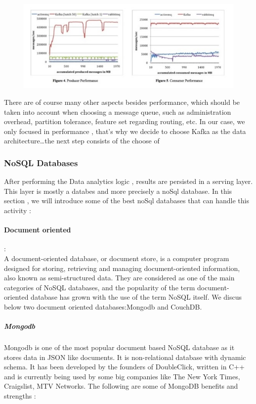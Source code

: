  \begin{figure}[h!]
	\centering
	\includegraphics[height=0.3\textheight]{fig01/MQPerformance}
	\label{fig:FilialesEtClients}
\end{figure}
There are of course many other aspects besides performance, 
which should be taken into account when choosing a message queue, 
such as administration overhead, partition tolerance, feature set regarding routing, etc. In our case, we only focused in performance ,
 that’s why we decide to choose Kafka as the data architecture…the next step consists of the choose of



\subsubsection{NoSQL Databases}
\label{sec:sec01}
After performing the Data analytics logic , results are persisted in a serving layer. This layer is mostly a databes and more 
precisely a noSql database. In this section , we will introduce some of the best noSql databases that can 
handle this activity :
\paragraph{Document oriented} 
\label{sec:sec01} :\\
A document-oriented database, or document store, is a computer program designed for storing, 
retrieving and managing document-oriented information, also known as semi-structured data.
 They are considered as one of the main categories of NoSQL databases, 
 and the popularity of the term document-oriented database has grown with the use of the term NoSQL itself.
 We discus below two document oriented databases:Mongodb and CouchDB.
\subparagraph{Mongodb} 
\label{sec:sec01}
Mongodb is one of the most popular document based NoSQL database as it stores data in JSON like documents.
 It is non-relational database with dynamic schema. 
 It has been developed by the founders of DoubleClick, written in C++ and is currently being used by 
 some big companies like The New York Times, Craigslist, MTV Networks. 
 The following are some of MongoDB benefits and strengths :

